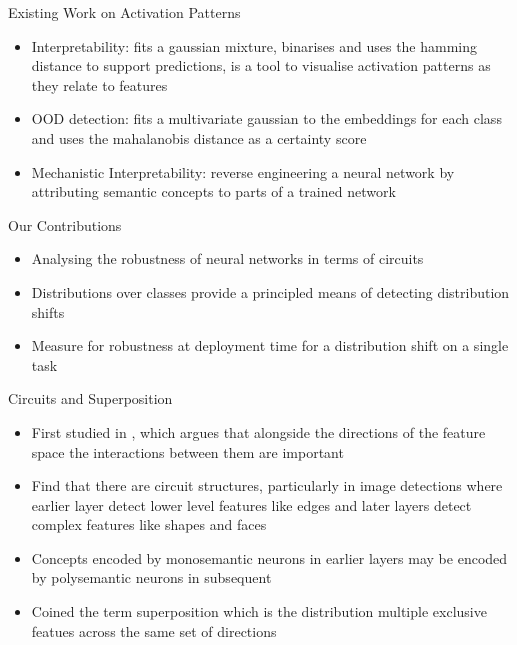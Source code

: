 \documentclass{beamer}
\begin{document}
    \begin{frame}{Existing Work on Activation Patterns}
        \begin{itemize}
            \setlength\itemsep{1em}
            \item 
                Interpretability: \cite{stano2020explainingpredictionsdeepneural} fits a gaussian mixture, binarises and uses the hamming distance to support predictions, \cite{bauerle2022neuralactivationpatternsnaps} is a tool to visualise activation patterns as they relate to features
            \item 
                OOD detection: \cite{lee2018simpleunifiedframeworkdetecting} fits a multivariate gaussian to the embeddings for each class and uses the mahalanobis distance as a certainty score
            \item 
                Mechanistic Interpretability: \cite{olah2017feature,lindsey2025biology} reverse engineering a neural network by attributing semantic concepts to parts of a trained network
        \end{itemize}
    \end{frame}

    \begin{frame}{Our Contributions}
        \begin{itemize}
            \setlength\itemsep{1em}
            \item 
                Analysing the robustness of neural networks in terms of circuits
            \item 
                Distributions over classes provide a principled means of detecting distribution shifts
            \item 
                Measure for robustness at deployment time for a distribution shift on a single task
        \end{itemize}
    \end{frame}

    \begin{frame}{Circuits and Superposition}
        \begin{itemize}
            \item 
                First studied in \cite{olah2020zoom}, which argues that alongside the directions of the feature space the interactions between them are important
            \item 
                Find that there are circuit structures, particularly in image detections where earlier layer detect lower level features like edges and later layers detect complex features like shapes and faces
            \item 
                Concepts encoded by monosemantic neurons in earlier layers may be encoded by polysemantic neurons in subsequent 
            \item 
                Coined the term superposition which is the distribution multiple exclusive featues across the same set of directions
        \end{itemize}
    \end{frame}
\end{document}

